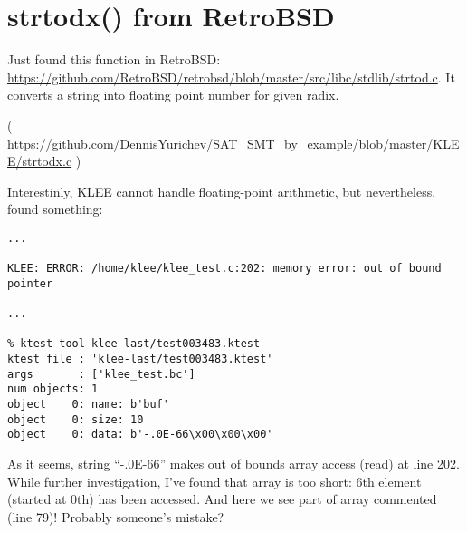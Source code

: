 \section{strtodx() from RetroBSD}

Just found this function in RetroBSD:
\url{https://github.com/RetroBSD/retrobsd/blob/master/src/libc/stdlib/strtod.c}.
It converts a string into floating point number for given radix.


( \url{https://github.com/DennisYurichev/SAT_SMT_by_example/blob/master/KLEE/strtodx.c} )

Interestinly, KLEE cannot handle floating-point arithmetic, but nevertheless, found something:

\begin{lstlisting}
...

KLEE: ERROR: /home/klee/klee_test.c:202: memory error: out of bound pointer

...

% ktest-tool klee-last/test003483.ktest
ktest file : 'klee-last/test003483.ktest'
args       : ['klee_test.bc']
num objects: 1
object    0: name: b'buf'
object    0: size: 10
object    0: data: b'-.0E-66\x00\x00\x00'
\end{lstlisting}

As it seems, string ``-.0E-66'' makes out of bounds array access (read) at line 202.
While further investigation, I've found that  array is too short:
6th element (started at 0th) has been accessed.
And here we see part of array commented (line 79)!
Probably someone's mistake?


